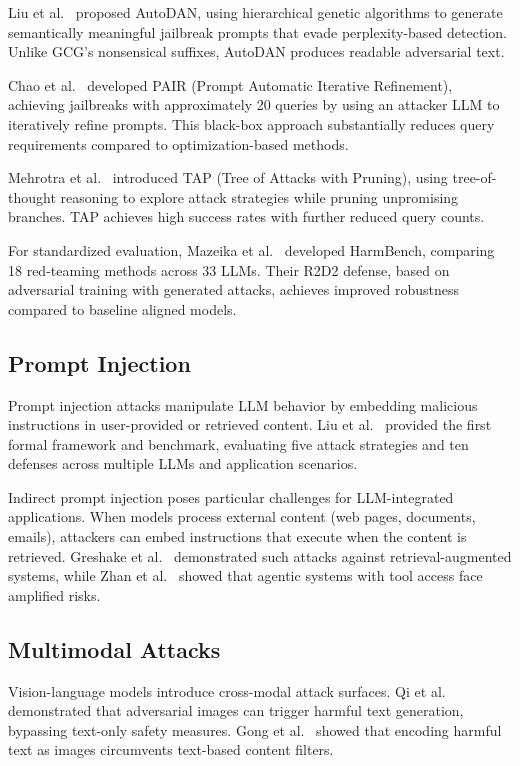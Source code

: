 \documentclass[11pt,a4paper]{article}
\begin{document}
Liu et al.~\citep{liu2024autodan} proposed AutoDAN, using hierarchical genetic algorithms to generate semantically meaningful jailbreak prompts that evade perplexity-based detection. Unlike GCG's nonsensical suffixes, AutoDAN produces readable adversarial text.

Chao et al.~\citep{chao2023jailbreaking} developed PAIR (Prompt Automatic Iterative Refinement), achieving jailbreaks with approximately 20 queries by using an attacker LLM to iteratively refine prompts. This black-box approach substantially reduces query requirements compared to optimization-based methods.

Mehrotra et al.~\citep{mehrotra2024tree} introduced TAP (Tree of Attacks with Pruning), using tree-of-thought reasoning to explore attack strategies while pruning unpromising branches. TAP achieves high success rates with further reduced query counts.

For standardized evaluation, Mazeika et al.~\citep{mazeika2024harmbench} developed HarmBench, comparing 18 red-teaming methods across 33 LLMs. Their R2D2 defense, based on adversarial training with generated attacks, achieves improved robustness compared to baseline aligned models.

\subsection{Prompt Injection}

Prompt injection attacks manipulate LLM behavior by embedding malicious instructions in user-provided or retrieved content. Liu et al.~\citep{liu2024prompt} provided the first formal framework and benchmark, evaluating five attack strategies and ten defenses across multiple LLMs and application scenarios.

Indirect prompt injection poses particular challenges for LLM-integrated applications. When models process external content (web pages, documents, emails), attackers can embed instructions that execute when the content is retrieved. Greshake et al.~\citep{greshake2023youve} demonstrated such attacks against retrieval-augmented systems, while Zhan et al.~\citep{zhan2024injecagent} showed that agentic systems with tool access face amplified risks.

\subsection{Multimodal Attacks}

Vision-language models introduce cross-modal attack surfaces. Qi et al.~\citep{qi2024visual} demonstrated that adversarial images can trigger harmful text generation, bypassing text-only safety measures. Gong et al.~\citep{gong2024figstep} showed that encoding harmful text as images circumvents text-based content filters.
\end{document}
